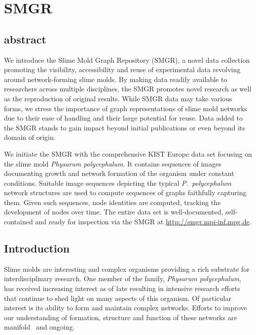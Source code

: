 \chapter{SMGR}

\section{abstract}

	We introduce the Slime Mold Graph Repository (SMGR), a novel data collection promoting the visibility, accessibility and reuse of experimental data revolving around network-forming slime molds. By making data readily available to researchers across multiple disciplines, the SMGR promotes novel research as well as the reproduction of original results. While SMGR data may take various forms, we stress the importance of graph representations of slime mold networks due to their ease of handling and their large potential for reuse. Data added to the SMGR stands to gain impact beyond initial publications or even beyond its domain of origin. 

	We initiate the SMGR with the comprehensive KIST Europe data set focusing on the slime mold \emph{Physarum polycephalum}. It contains sequences of images documenting growth and network formation of the organism under constant conditions. Suitable image sequences depicting the typical \emph{P.~polycephalum} network structures are used to compute sequences of graphs faithfully capturing them. Given such sequences, node identities are computed, tracking the development of nodes over time. The entire data set is well-documented, self-contained and ready for inspection via the SMGR at \href{http://smgr.mpi-inf.mpg.de}{http://smgr.mpi-inf.mpg.de}.

\section{Introduction}

	Slime molds are interesting and complex organisms providing a rich substrate for interdisciplinary research. One member of the family, \emph{Physarum polycephalum}, has received increasing interest as of late resulting in intensive research efforts that continue to shed light on many aspects of this organism. Of particular interest is its ability to form and maintain complex networks. Efforts to improve our understanding of formation, structure and function of these networks are manifold~\cite{Marwan419,tero2010rules,alim2013random,baumgarten2010plasmodial,baumgarten2013functional} and ongoing.

